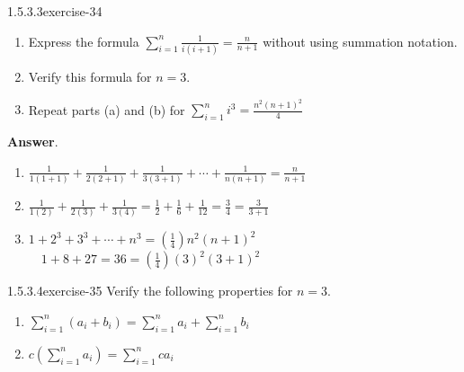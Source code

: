 \documentclass[twoside,10pt,]{book}
\numberwithin{equation}{section}
\begin{document}
\begin{divisionsolution}{1.5.3.3}{}{exercise-34}%
\hypertarget{p-518}{}%
\leavevmode%
\begin{enumerate}[label=(\alph*)]
\item\hypertarget{li-371}{}\hypertarget{p-519}{}%
Express the formula \(\sum_{i=1}^n \frac{1}{i(i+1)}= \frac{n}{n+1}\)  without using summation notation.%
\item\hypertarget{li-372}{}\hypertarget{p-520}{}%
Verify this formula for \(n=3\).%
\item\hypertarget{li-373}{}\hypertarget{p-521}{}%
Repeat parts (a) and (b) for \(\sum_{i=1}^n i^3=\frac{n^2(n+1)^2}{4}\)%
\end{enumerate}
%
\par\smallskip%
\noindent\textbf{Answer}.\quad%
\hypertarget{p-522}{}%
\leavevmode%
\begin{enumerate}[label=(\alph*)]
\item\hypertarget{li-374}{}\hypertarget{p-523}{}%
\(\frac{1}{1 (1+1)}+\frac{1}{2 (2+1)}+\frac{1}{3 (3+1)}+\cdots +\frac{1}{n(n+1)}=\frac{n}{n+1}\)%
\item\hypertarget{li-375}{}\hypertarget{p-524}{}%
\(\frac{1}{1(2)}+\frac{1}{2(3)}+\frac{1}{3(4)}=\frac{1}{2}+\frac{1}{6}+\frac{1}{12}=\frac{3}{4}=\frac{3}{3+1}\)%
\item\hypertarget{li-376}{}\hypertarget{p-525}{}%
\(1+2^3+3^3+\cdots +n^3=\left(\frac{1}{4}\right)n^2(n+1)^2\) \(\quad 1+8+27=36 = \left(\frac{1}{4}\right)(3)^2(3+1)^2\)%
\end{enumerate}
%
\end{divisionsolution}%
\begin{divisionsolution}{1.5.3.4}{}{exercise-35}%
\hypertarget{p-526}{}%
Verify the following properties for \(n = 3\).%
\par
\hypertarget{p-527}{}%
\leavevmode%
\begin{enumerate}[label=(\alph*)]
\item\hypertarget{li-377}{}\hypertarget{p-528}{}%
\(\sum_{i=1}^n \left(a_i+ b_i\right) =\sum_{i=1}^n a_i +\sum_{i=1}^n  b_i\)%
\item\hypertarget{li-378}{}\hypertarget{p-529}{}%
\(c\left(\sum_{i=1}^n a_i\right) = \sum_{i=1}^n c a_i\)%
\end{enumerate}
%
\end{divisionsolution}%
\end{document}
